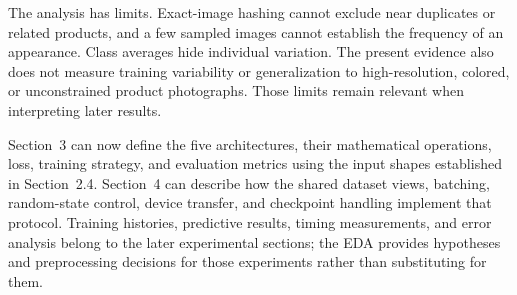 The analysis has limits. Exact-image hashing cannot exclude near duplicates
or related products, and a few sampled images cannot establish the frequency
of an appearance. Class averages hide individual variation. The present
evidence also does not measure training variability or generalization to
high-resolution, colored, or unconstrained product photographs. Those limits
remain relevant when interpreting later results.

Section~3 can now define the five architectures, their mathematical
operations, loss, training strategy, and evaluation metrics using the input
shapes established in Section~2.4. Section~4 can describe how the shared
dataset views, batching, random-state control, device transfer, and checkpoint
handling implement that protocol. Training histories, predictive results,
timing measurements, and error analysis belong to the later experimental
sections; the EDA provides hypotheses and preprocessing decisions for those
experiments rather than substituting for them.
